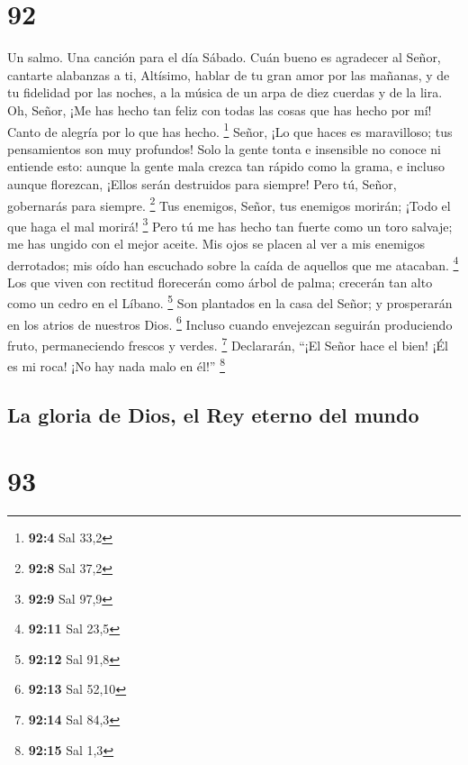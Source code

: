 \hypertarget{section-91}{%
\section{92}\label{section-91}}

Un salmo. Una canción para el día Sábado.  Cuán bueno es
agradecer al Señor, cantarte alabanzas a ti, Altísimo, 
hablar de tu gran amor por las mañanas, y de tu fidelidad por las
noches,  a la música de un arpa de diez cuerdas y de la
lira.  Oh, Señor, ¡Me has hecho tan feliz con todas las
cosas que has hecho por mí! Canto de alegría por lo que has hecho.
\footnote{\textbf{92:4} Sal 33,2}  Señor, ¡Lo que haces es
maravilloso; tus pensamientos son muy profundos!  Solo la
gente tonta e insensible no conoce ni entiende esto:  aunque
la gente mala crezca tan rápido como la grama, e incluso aunque
florezcan, ¡Ellos serán destruidos para siempre!  Pero tú,
Señor, gobernarás para siempre. \footnote{\textbf{92:8} Sal 37,2}
 Tus enemigos, Señor, tus enemigos morirán; ¡Todo el que
haga el mal morirá! \footnote{\textbf{92:9} Sal 97,9}  Pero
tú me has hecho tan fuerte como un toro salvaje; me has ungido con el
mejor aceite.  Mis ojos se placen al ver a mis enemigos
derrotados; mis oído han escuchado sobre la caída de aquellos que me
atacaban. \footnote{\textbf{92:11} Sal 23,5}  Los que viven
con rectitud florecerán como árbol de palma; crecerán tan alto como un
cedro en el Líbano. \footnote{\textbf{92:12} Sal 91,8}  Son
plantados en la casa del Señor; y prosperarán en los atrios de nuestros
Dios. \footnote{\textbf{92:13} Sal 52,10}  Incluso cuando
envejezcan seguirán produciendo fruto, permaneciendo frescos y verdes.
\footnote{\textbf{92:14} Sal 84,3}  Declararán, ``¡El Señor
hace el bien! ¡Él es mi roca! ¡No hay nada malo en él!'' \footnote{\textbf{92:15}
  Sal 1,3}

\hypertarget{la-gloria-de-dios-el-rey-eterno-del-mundo}{%
\subsection{La gloria de Dios, el Rey eterno del
mundo}\label{la-gloria-de-dios-el-rey-eterno-del-mundo}}

\hypertarget{section-92}{%
\section{93}\label{section-92}}

